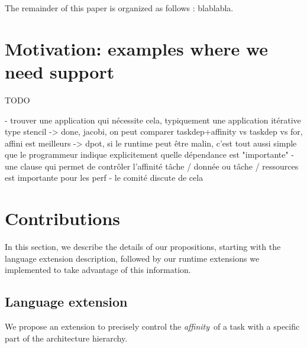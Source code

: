 \documentclass{Styles/llncs}
\begin{document}

The remainder of this paper is organized as follows : blablabla.

\section{Motivation: examples where we need support}

TODO

- trouver une application qui nécessite cela, typiquement une application itérative type stencil
  -> done, jacobi, on peut comparer taskdep+affinity vs taskdep vs for, affini est meilleurs
  -> dpot, si le runtime peut être malin, c'est tout aussi simple que le programmeur indique explicitement quelle dépendance est "importante"
- une clause qui permet de contrôler l’affinité tâche / donnée ou tâche / ressources est importante pour les perf
- le comité discute de cela

\section{Contributions}

In this section, we describe the details of our propositions, starting with the
language extension description, followed by our runtime extensions we implemented
to take advantage of this information.



\subsection{Language extension}

We propose an extension to precisely control the \emph{affinity} of a task with a specific part of the architecture hierarchy.
\end{document}
